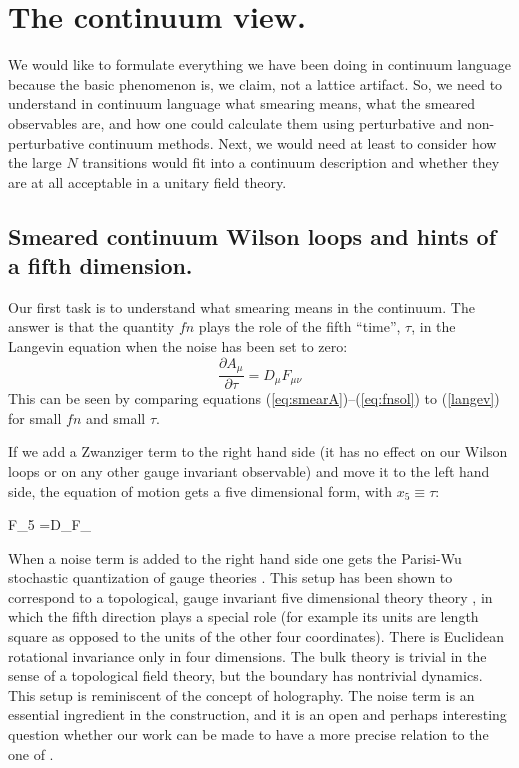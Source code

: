 \section{The continuum view.}

We would like to formulate everything we have been doing in
continuum language because the basic phenomenon is, we claim, not
a lattice artifact. So, we need to understand in continuum
language what smearing means, what the smeared observables are,
and how one could calculate them using perturbative and
non-perturbative continuum methods. Next, we would need at least
to consider how the large $N$ transitions would fit into a
continuum description and whether they are at all acceptable in a
unitary field theory.

\subsection{Smeared continuum Wilson loops and hints of a fifth dimension.}

Our first task is to understand what smearing means in the
continuum. The answer is that the quantity $f n$ plays the role of
the fifth ``time'', $\tau$, in the Langevin equation when the
noise has been set to zero:
\begin{equation}
\frac{\partial A_\mu}{\partial\tau} =D_\mu F_{\mu\nu}
\label{langev}
\end{equation}
This can be seen by comparing equations (\ref{eq:smearA})--(\ref{eq:fnsol}) to (\ref{langev}) for
small $f n$ and small $\tau$.

If we add a Zwanziger term \cite{zwa135} to the right hand side
(it has no effect on our Wilson loops or on any other gauge
invariant observable) and move it to the left hand side, the
equation of motion gets a five dimensional form, with $x_5\equiv
\tau$:

\be
F_{5\nu} =D_\mu F_{\mu\nu} \ee


When a noise term is added to the right hand side one gets the
Parisi-Wu stochastic quantization of gauge theories \cite{stoch13}.
This setup has been shown to correspond to a topological, gauge
invariant five dimensional theory theory \cite{balzwa14}, in which
the fifth direction plays a special role (for example its units
are length square as opposed to the units of the other four
coordinates). There is Euclidean rotational invariance only in four
dimensions. The bulk theory is trivial in the sense of a
topological field theory, but the boundary has nontrivial
dynamics. This setup is reminiscent of the concept of holography.
The noise term is an essential ingredient in the construction, and
it is an open and perhaps interesting question whether our work
can be made to have a more precise relation to the one of \cite{balzwa14}.

